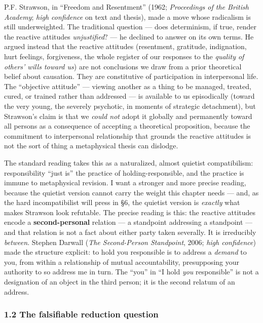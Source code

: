 \documentclass[11pt]{article}
\begin{document}
P.F. Strawson, in ``Freedom and Resentment'' (1962; \emph{Proceedings of the British Academy}; \emph{high confidence} on text and thesis), made a move whose radicalism is still underweighted. The traditional question — does determinism, if true, render the reactive attitudes \emph{unjustified}? — he declined to answer on its own terms. He argued instead that the reactive attitudes (resentment, gratitude, indignation, hurt feelings, forgiveness, the whole register of our responses to the \emph{quality of others' wills toward us}) are not conclusions we draw from a prior theoretical belief about causation. They are constitutive of participation in interpersonal life. The ``objective attitude'' — viewing another as a thing to be managed, treated, cured, or trained rather than addressed — is available to us episodically (toward the very young, the severely psychotic, in moments of strategic detachment), but Strawson's claim is that we \emph{could not} adopt it globally and permanently toward all persons as a consequence of accepting a theoretical proposition, because the commitment to interpersonal relationship that grounds the reactive attitudes is not the sort of thing a metaphysical thesis can dislodge.

The standard reading takes this as a naturalized, almost quietist compatibilism: responsibility ``just is'' the practice of holding-responsible, and the practice is immune to metaphysical revision. I want a stronger and more precise reading, because the quietist version cannot carry the weight this chapter needs — and, as the hard incompatibilist will press in §6, the quietist version is \emph{exactly} what makes Strawson look refutable. The precise reading is this: the reactive attitudes encode a \textbf{second-personal} relation — a standpoint addressing a standpoint — and that relation is not a fact about either party taken severally. It is irreducibly \emph{between}. Stephen Darwall (\emph{The Second-Person Standpoint}, 2006; \emph{high confidence}) made the structure explicit: to hold you responsible is to address a \emph{demand} to you, from within a relationship of mutual accountability, presupposing your authority to so address me in turn. The ``you'' in ``I hold \emph{you} responsible'' is not a designation of an object in the third person; it is the second relatum of an address.

\subsubsection*{1.2 The falsifiable reduction question}
\end{document}
